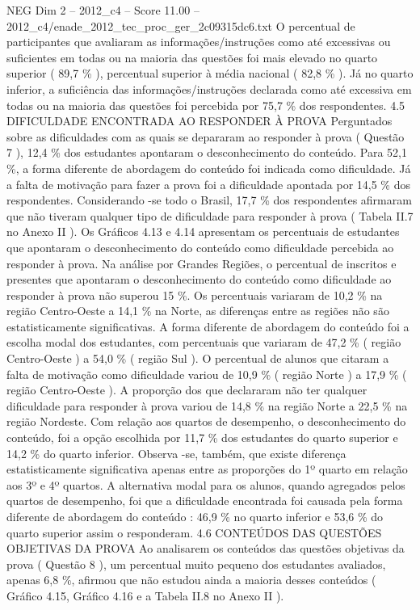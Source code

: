 \begin{textsample}{NEG Dim 2 – 2012\_c4 – Score 11.00 – 2012\_c4/enade\_2012\_tec\_proc\_ger\_2c09315dc6.txt}
O percentual de participantes que avaliaram as informações/instruções como até excessivas ou suficientes em todas ou na maioria das questões foi mais elevado no quarto superior ( 89,7 \% ), percentual superior à média nacional ( 82,8 \% ).
Já no quarto inferior, a suficiência das informações/instruções declarada como até excessiva em todas ou na maioria das questões foi percebida por 75,7 \% dos respondentes. 4.5 DIFICULDADE ENCONTRADA AO RESPONDER À PROVA Perguntados sobre as dificuldades com as quais se depararam ao responder à prova ( Questão 7 ), 12,4 \% dos estudantes apontaram o desconhecimento do conteúdo.
Para 52,1 \%, a forma diferente de abordagem do conteúdo foi indicada como dificuldade.
Já a falta de motivação para fazer a prova foi a dificuldade apontada por 14,5 \% dos respondentes.
Considerando -se todo o Brasil, 17,7 \% dos respondentes afirmaram que não tiveram qualquer tipo de dificuldade para responder à prova ( Tabela II.7 no Anexo II ).
Os Gráficos 4.13 e 4.14 apresentam os percentuais de estudantes que apontaram o desconhecimento do conteúdo como dificuldade percebida ao responder à prova.
Na análise por Grandes Regiões, o percentual de inscritos e presentes que apontaram o desconhecimento do conteúdo como dificuldade ao responder à prova não superou 15 \%.
Os percentuais variaram de 10,2 \% na região Centro-Oeste a 14,1 \% na Norte, as diferenças entre as regiões não são estatisticamente significativas.
A forma diferente de abordagem do conteúdo foi a escolha modal dos estudantes, com percentuais que variaram de 47,2 \% ( região Centro-Oeste ) a 54,0 \% ( região Sul ).
O percentual de alunos que citaram a falta de motivação como dificuldade variou de 10,9 \% ( região Norte ) a 17,9 \% ( região Centro-Oeste ).
A proporção dos que declararam não ter qualquer dificuldade para responder à prova variou de 14,8 \% na região Norte a 22,5 \% na região Nordeste.
Com relação aos quartos de desempenho, o desconhecimento do conteúdo, foi a opção escolhida por 11,7 \% dos estudantes do quarto superior e 14,2 \% do quarto inferior.
Observa -se, também, que existe diferença estatisticamente significativa apenas entre as proporções do 1º quarto em relação aos 3º e 4º quartos.
A alternativa modal para os alunos, quando agregados pelos quartos de desempenho, foi que a dificuldade encontrada foi causada pela forma diferente de abordagem do conteúdo : 46,9 \% no quarto inferior e 53,6 \% do quarto superior assim o responderam. 4.6 CONTEÚDOS DAS QUESTÕES OBJETIVAS DA PROVA Ao analisarem os conteúdos das questões objetivas da prova ( Questão 8 ), um percentual muito pequeno dos estudantes avaliados, apenas 6,8 \%, afirmou que não estudou ainda a maioria desses conteúdos ( Gráfico 4.15, Gráfico 4.16 e a Tabela II.8 no Anexo II ).

\end{textsample}

